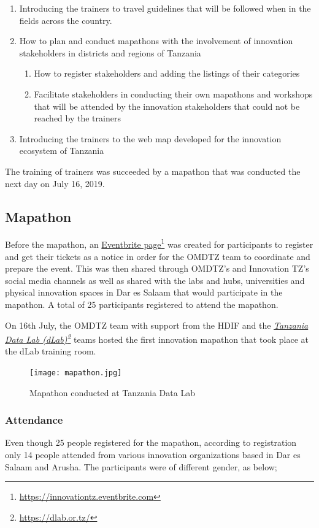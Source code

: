 \documentclass[a4paper,12pt,twoside]{article}
\begin{document}
\begin{enumerate}
	\item Introducing the trainers to travel guidelines that will be followed when in the fields across the country.
	\item How to plan and conduct mapathons with the involvement of innovation stakeholders in districts and regions of Tanzania
	\begin{enumerate}
		\item How to register stakeholders and adding the listings of their categories
		\item Facilitate stakeholders in conducting their own mapathons and workshops that will be attended by the innovation stakeholders that could not be reached by the trainers
	\end{enumerate}
	\item Introducing the trainers to the web map developed for the innovation ecosystem of Tanzania
\end{enumerate}

The training of trainers was succeeded by a mapathon that was conducted the next day on July 16, 2019.

\subsection{Mapathon}
Before the mapathon, an \href{https://innovationtz.eventbrite.com}{Eventbrite page}\footnote{\url{https://innovationtz.eventbrite.com}} was created for participants to register and get their tickets as a notice in order for the OMDTZ team to coordinate and prepare the event. This was then shared through OMDTZ’s and Innovation TZ’s social media channels as well as shared with the labs and hubs, universities and physical innovation spaces in Dar es Salaam that would participate in the mapathon. A total of 25 participants registered to attend the mapathon.

On 16th July, the OMDTZ team with support from the HDIF and the \textit{\href{https://dlab.or.tz/}{Tanzania Data Lab (dLab)}\footnote{\url{https://dlab.or.tz/}}} teams hosted the first innovation mapathon that took place at the dLab training room. 

\begin{figure}[H]
	\centering
	\texttt{[image: mapathon.jpg]}
	\caption{Mapathon conducted at Tanzania Data Lab}
\end{figure}

\newpage
\subsubsection{Attendance}
Even though 25 people registered for the mapathon, according to registration only 14 people attended from various innovation organizations based in Dar es Salaam and Arusha. The participants were of different gender, as below;
\end{document}
